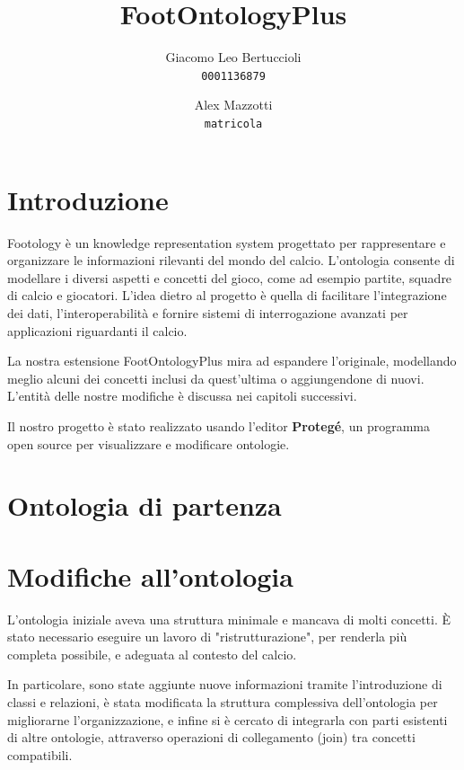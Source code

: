 \documentclass[11pt]{report} %
\title{FootOntologyPlus}
\author{
  Giacomo Leo Bertuccioli\\
  \texttt{0001136879}
  \and
  Alex Mazzotti\\
  \texttt{matricola}
}
\date{} %
\begin{document}
\maketitle

\newpage

\renewcommand*\contentsname{Indice}

\tableofcontents
\newpage

\chapter{Introduzione}

Footology \cite{foot} è un knowledge representation system progettato per rappresentare e organizzare le informazioni rilevanti del mondo del calcio.
L'ontologia consente di modellare i diversi aspetti e concetti del gioco, come ad esempio partite, squadre di calcio e giocatori.
L'idea dietro al progetto è quella di facilitare l'integrazione dei dati, l'interoperabilità e fornire sistemi di interrogazione avanzati per applicazioni riguardanti il calcio.

\hfill

La nostra estensione FootOntologyPlus mira ad espandere l'originale, modellando meglio alcuni dei concetti inclusi da quest'ultima o aggiungendone di nuovi.
L'entità delle nostre modifiche è discussa nei capitoli successivi.

\hfill

Il nostro progetto è stato realizzato usando l'editor \textbf{Protegé}, un programma open source per visualizzare e modificare ontologie.

\chapter{Ontologia di partenza}

\chapter{Modifiche all'ontologia}
L'ontologia iniziale aveva una struttura minimale e mancava di molti concetti.
È stato necessario eseguire un lavoro di "ristrutturazione", per renderla più completa possibile, e adeguata al contesto del calcio.

In particolare, sono state aggiunte nuove informazioni tramite l’introduzione di classi e relazioni, è stata modificata la struttura complessiva dell’ontologia per migliorarne l’organizzazione, e infine si è cercato di integrarla con parti esistenti di altre ontologie, attraverso operazioni di collegamento (join) tra concetti compatibili.
 \newpage
\end{document}
